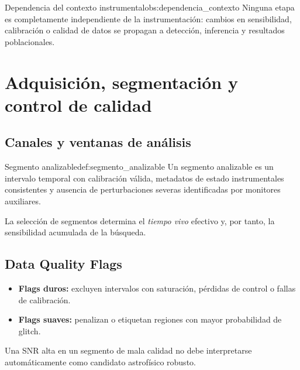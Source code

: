 \begin{observacion}{Dependencia del contexto instrumental}{obs:dependencia_contexto}
Ninguna etapa es completamente independiente de la instrumentación: cambios en sensibilidad, calibración o calidad de datos se propagan a detección, inferencia y resultados poblacionales.
\end{observacion}

\section{Adquisición, segmentación y control de calidad}
\label{sec:adquisicion_calidad}

\subsection{Canales y ventanas de análisis}

\begin{definicion}{Segmento analizable}{def:segmento_analizable}
Un segmento analizable es un intervalo temporal con calibración válida, metadatos de estado instrumentales consistentes y ausencia de perturbaciones severas identificadas por monitores auxiliares.
\end{definicion}

La selección de segmentos determina el \emph{tiempo vivo} efectivo y, por tanto, la sensibilidad acumulada de la búsqueda.

\subsection{Data Quality Flags}

\begin{itemize}[leftmargin=2em]
  \item \textbf{Flags duros:} excluyen intervalos con saturación, pérdidas de control o fallas de calibración.
  \item \textbf{Flags suaves:} penalizan o etiquetan regiones con mayor probabilidad de glitch.
\end{itemize}

\begin{importante}
Una SNR alta en un segmento de mala calidad no debe interpretarse automáticamente como candidato astrofísico robusto.
\end{importante}

